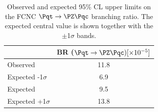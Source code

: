 \begin{table}[htbp]
	\centering
	\begin{tabular}{lc} 
		\toprule
		& BR ($\Pqt\rightarrow\PZ\Pqc) [\times 10^{-5}]$  \\
		\midrule
		Observed  				   					& 11.8  \\
		Expected -1$\sigma$   				  &   6.9 \\
		Expected                    				&  9.5 \\
		Expected +1$\sigma$  				 &  13.8 \\		
		\bottomrule
	\end{tabular}
	\caption{
		Observed and expected 95\% CL upper limits on the FCNC $\Pqt\rightarrow\PZ\Pqc$ branching ratio. 
		The expected central value is shown together with the $\pm$1$\sigma$ bands.
	}%
	\label{tab:results:limits}
\end{table}

